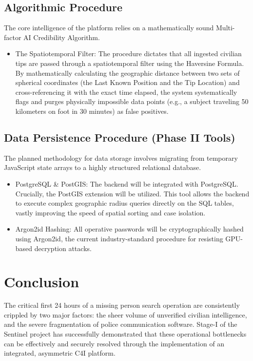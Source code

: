 \documentclass[12pt,a4paper]{report}
\begin{document}
\section{Algorithmic Procedure}
The core intelligence of the platform relies on a mathematically sound Multi-factor AI Credibility Algorithm.
\begin{itemize}
    \item The Spatiotemporal Filter: The procedure dictates that all ingested civilian tips are passed through a spatiotemporal filter using the Haversine Formula. By mathematically calculating the geographic distance between two sets of spherical coordinates (the Last Known Position and the Tip Location) and cross-referencing it with the exact time elapsed, the system systematically flags and purges physically impossible data points (e.g., a subject traveling 50 kilometers on foot in 30 minutes) as false positives.
\end{itemize}

\section{Data Persistence Procedure (Phase II Tools)}
The planned methodology for data storage involves migrating from temporary JavaScript state arrays to a highly structured relational database.
\begin{itemize}
    \item PostgreSQL \& PostGIS: The backend will be integrated with PostgreSQL. Crucially, the PostGIS extension will be utilized. This tool allows the backend to execute complex geographic radius queries directly on the SQL tables, vastly improving the speed of spatial sorting and case isolation.
    \item Argon2id Hashing: All operative passwords will be cryptographically hashed using Argon2id, the current industry-standard procedure for resisting GPU-based decryption attacks.
\end{itemize}


\chapter{Conclusion}

The critical first 24 hours of a missing person search operation are consistently crippled by two major factors: the sheer volume of unverified civilian intelligence, and the severe fragmentation of police communication software. Stage-I of the Sentinel project has successfully demonstrated that these operational bottlenecks can be effectively and securely resolved through the implementation of an integrated, asymmetric C4I platform.
\end{document}
